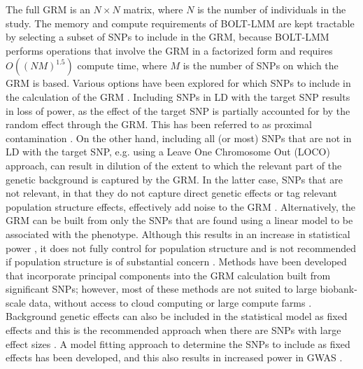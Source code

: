 \documentclass[fleqn,10pt]{wlscirep}
\begin{document}
The full GRM is an $N \times N$ matrix, where $N$ is the number of individuals in the study. The memory and compute requirements of BOLT-LMM are kept tractable by selecting a subset of SNPs to include in the GRM, because BOLT-LMM performs operations that involve the GRM in a factorized form and requires $O((NM)^{1.5})$ compute time, where $M$ is the number of SNPs on which the GRM is based. Various options have been explored for which SNPs to include in the calculation of the GRM \cite{yang2014advantages}. Including SNPs in LD with the target SNP results in loss of power, as the effect of the target SNP is partially accounted for by the random effect through the GRM. This has been referred to as proximal contamination \cite{listgarten2012improved}. On the other hand, including all (or most) SNPs that are not in LD with the target SNP, e.g. using a Leave One Chromosome Out (LOCO) approach, can result in dilution of the extent to which the relevant part of the genetic background is captured by the GRM. In the latter case, SNPs that are not relevant, in that they do not capture direct genetic effects or tag relevant population structure effects, effectively add noise to the GRM \cite{listgarten2012improved}. Alternatively, the GRM can be built from only the SNPs that are found using a linear model to be associated with the phenotype. Although this results in an increase in statistical power \cite{fastlmm,yang2014advantages,lippert2013benefits}, it does not fully control for population structure and is not recommended if population structure is of substantial concern \cite{BOLT,yang2014advantages}. Methods have been developed that incorporate principal components into the GRM calculation built from significant SNPs; however, most of these methods are not suited to large biobank-scale data, without access to cloud computing or large compute farms \cite{tucker2014improving,canela2018atlas,kadie2019ludicrous}. Background genetic effects can also be included in the statistical model as fixed effects and this is the recommended approach when there are SNPs with large effect sizes \cite{yang2014advantages}. A model fitting approach to determine the SNPs to include as fixed effects has been developed, and this also results in increased power in GWAS \cite{listgarten2012improved}.  


\par\par
\end{document}
